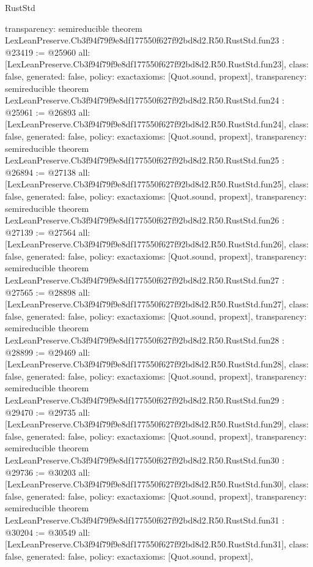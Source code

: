 \begin{lexlean}{RustStd}
\begin{coremodule}
{  transparency: semireducible
}
theorem LexLeanPreserve.Cb3f94f79f9e8df177550f627f92bd8d2.R50.RustStd.fun23 : @23419 := @25960 {
  all: [LexLeanPreserve.Cb3f94f79f9e8df177550f627f92bd8d2.R50.RustStd.fun23],
  class: false,
  generated: false,
  policy: exact{axioms: [Quot.sound, propext]},
  transparency: semireducible
}
theorem LexLeanPreserve.Cb3f94f79f9e8df177550f627f92bd8d2.R50.RustStd.fun24 : @25961 := @26893 {
  all: [LexLeanPreserve.Cb3f94f79f9e8df177550f627f92bd8d2.R50.RustStd.fun24],
  class: false,
  generated: false,
  policy: exact{axioms: [Quot.sound, propext]},
  transparency: semireducible
}
theorem LexLeanPreserve.Cb3f94f79f9e8df177550f627f92bd8d2.R50.RustStd.fun25 : @26894 := @27138 {
  all: [LexLeanPreserve.Cb3f94f79f9e8df177550f627f92bd8d2.R50.RustStd.fun25],
  class: false,
  generated: false,
  policy: exact{axioms: [Quot.sound, propext]},
  transparency: semireducible
}
theorem LexLeanPreserve.Cb3f94f79f9e8df177550f627f92bd8d2.R50.RustStd.fun26 : @27139 := @27564 {
  all: [LexLeanPreserve.Cb3f94f79f9e8df177550f627f92bd8d2.R50.RustStd.fun26],
  class: false,
  generated: false,
  policy: exact{axioms: [Quot.sound, propext]},
  transparency: semireducible
}
theorem LexLeanPreserve.Cb3f94f79f9e8df177550f627f92bd8d2.R50.RustStd.fun27 : @27565 := @28898 {
  all: [LexLeanPreserve.Cb3f94f79f9e8df177550f627f92bd8d2.R50.RustStd.fun27],
  class: false,
  generated: false,
  policy: exact{axioms: [Quot.sound, propext]},
  transparency: semireducible
}
theorem LexLeanPreserve.Cb3f94f79f9e8df177550f627f92bd8d2.R50.RustStd.fun28 : @28899 := @29469 {
  all: [LexLeanPreserve.Cb3f94f79f9e8df177550f627f92bd8d2.R50.RustStd.fun28],
  class: false,
  generated: false,
  policy: exact{axioms: [Quot.sound, propext]},
  transparency: semireducible
}
theorem LexLeanPreserve.Cb3f94f79f9e8df177550f627f92bd8d2.R50.RustStd.fun29 : @29470 := @29735 {
  all: [LexLeanPreserve.Cb3f94f79f9e8df177550f627f92bd8d2.R50.RustStd.fun29],
  class: false,
  generated: false,
  policy: exact{axioms: [Quot.sound, propext]},
  transparency: semireducible
}
theorem LexLeanPreserve.Cb3f94f79f9e8df177550f627f92bd8d2.R50.RustStd.fun30 : @29736 := @30203 {
  all: [LexLeanPreserve.Cb3f94f79f9e8df177550f627f92bd8d2.R50.RustStd.fun30],
  class: false,
  generated: false,
  policy: exact{axioms: [Quot.sound, propext]},
  transparency: semireducible
}
theorem LexLeanPreserve.Cb3f94f79f9e8df177550f627f92bd8d2.R50.RustStd.fun31 : @30204 := @30549 {
  all: [LexLeanPreserve.Cb3f94f79f9e8df177550f627f92bd8d2.R50.RustStd.fun31],
  class: false,
  generated: false,
  policy: exact{axioms: [Quot.sound, propext]},
}
\end{coremodule}
\end{lexlean}

